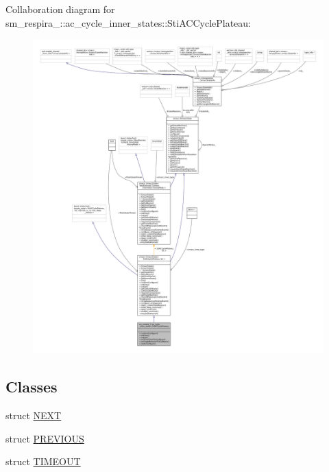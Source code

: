 Collaboration diagram for sm\+\_\+respira\+\_\+:\+:ac\+\_\+cycle\+\_\+inner\+\_\+states\+:\+:Sti\+A\+C\+Cycle\+Plateau\+:
\nopagebreak
\begin{figure}[H]
\begin{center}
\leavevmode
\includegraphics[width=350pt]{structsm__respira__1_1_1ac__cycle__inner__states_1_1StiACCyclePlateau__coll__graph}
\end{center}
\end{figure}
\subsection*{Classes}
\begin{DoxyCompactItemize}
\item 
struct \hyperlink{structsm__respira__1_1_1ac__cycle__inner__states_1_1StiACCyclePlateau_1_1NEXT}{N\+E\+XT}
\item 
struct \hyperlink{structsm__respira__1_1_1ac__cycle__inner__states_1_1StiACCyclePlateau_1_1PREVIOUS}{P\+R\+E\+V\+I\+O\+US}
\item 
struct \hyperlink{structsm__respira__1_1_1ac__cycle__inner__states_1_1StiACCyclePlateau_1_1TIMEOUT}{T\+I\+M\+E\+O\+UT}
\end{DoxyCompactItemize}
